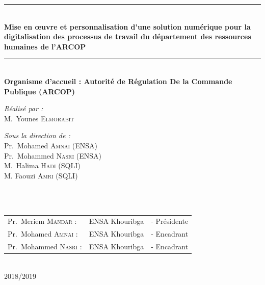 \begin{titlepage}
\begin{center}
\rule{\linewidth}{0.3mm} \\[0.4cm]
{ \huge \bfseries\color{blue!70!black} Mise en œuvre et personnalisation d'une solution numérique pour la digitalisation des processus de travail du département des ressources humaines de l'ARCOP \\[0.4cm] }
\rule{\linewidth}{0.3mm} \\[1cm]
{\large \bfseries Organisme d'accueil : Autorité de Régulation De la Commande Publique (ARCOP) }\\[1cm]
\noindent
\begin{minipage}{0.4\textwidth}
  \begin{flushleft} \large
    \emph{\color{orange!80!black}Réalisé par :}\\
    M.~Younes \textsc{Elmorabit}\\
  \end{flushleft}
\end{minipage}%
\begin{minipage}{0.5\textwidth}
  \begin{flushright} \large
    \emph{\color{orange!80!black}Sous la direction de :} \\
    Pr.~Mohamed \textsc{Amnai} (ENSA)\\
    Pr.~Mohammed \textsc{Nasri} (ENSA)\\
    M.~Halima \textsc{Hadi} (SQLI)\\
    M. Faouzi \textsc{Amri} (SQLI)\\
  \end{flushright}
\end{minipage}\\[1cm]

\\[0.5cm]

\color{black}
\centering
\begin{tabular}{lll}
\large Pr.~Meriem \textsc{Mandar} : & \large ENSA Khouribga & \large - Présidente \\[0.1cm]
\large Pr.~Mohamed \textsc{Amnai} : & \large ENSA Khouribga & \large - Encadrant \\[0.1cm]
\large Pr.~Mohammed \textsc{Nasri} : & \large ENSA Khouribga & \large - Encadrant
\end{tabular}

\vfill

{\large \color{orange!80!black}{Année universitaire}\\ \color{blue!80!black}2018/2019}

\end{center}
\end{titlepage}
